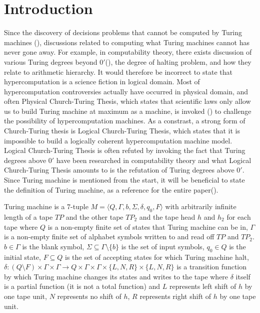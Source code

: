 \documentclass{roffin}
\begin{document}
\section{Introduction}
Since the discovery of decisions problems that cannot be computed by Turing machines (\cite{turing36}), discussions related to computing what Turing machines cannot has never gone away. For example, in computability theory, there exists discussion of various Turing degrees beyond $0'$(\cite{kleene54}), the degree of halting problem, and how they relate to arithmetic hierarchy. It would therefore be incorrect to state that hypercomputation is a science fiction in logical domain. Most of hypercomputation controversies actually have occurred in physical domain, and often Physical Church-Turing Thesis, which states that scientific laws only allow us to build Turing machine at maximum as a machine, is invoked (\cite{fitz06}) to challenge the possibility of hypercomputation machines. As a constrast, a strong form of Church-Turing thesis is Logical Church-Turing Thesis, which states that it is impossible to build a logically coherent hypercomputation machine model. Logical Church-Turing Thesis is often refuted by invoking the fact that Turing degrees above $0'$ have been researched in computability theory and what Logical Church-Turing Thesis amounts to is the refutation of Turing degrees above $0'$. Since Turing machine is mentioned from the start, it will be beneficial to state the definition of Turing machine, as a reference for the entire paper(\cite{hopcroft79}).
\begin{definition}
Turing machine is a 7-tuple $M= \langle Q, \Gamma, b, \Sigma, \delta, q_0, F \rangle$ with arbitrarily infinite length of a tape $TP$ and the other tape $TP_2$ and the tape head $h$ and $h_2$ for each tape where $Q$ is a non-empty finite set of states that Turing machine can be in, $\Gamma$ is a non-empty finite set of alphabet symbols written to and read off $TP$ and $TP_2$. $b \in  \Gamma$ is the blank symbol, $\Sigma\subseteq\Gamma\setminus\{b\}$ is the set of input symbols, $q_0 \in Q$ is the initial state, $F \subseteq Q$ is the set of accepting states for which Turing machine halt, $\delta: (Q \setminus F) \times \Gamma \times \Gamma \rightarrow Q \times \Gamma \times \Gamma \times \{L,N,R\} \times \{L,N,R\}$ is a transition function by which Turing machine changes its states and writes to the tape where $\delta$ itself is a partial function (it is not a total function) and $L$ represents left shift of $h$ by one tape unit, $N$ represents no shift of $h$, $R$ represents right shift of $h$ by one tape unit.  
\end{definition}
\end{document}
